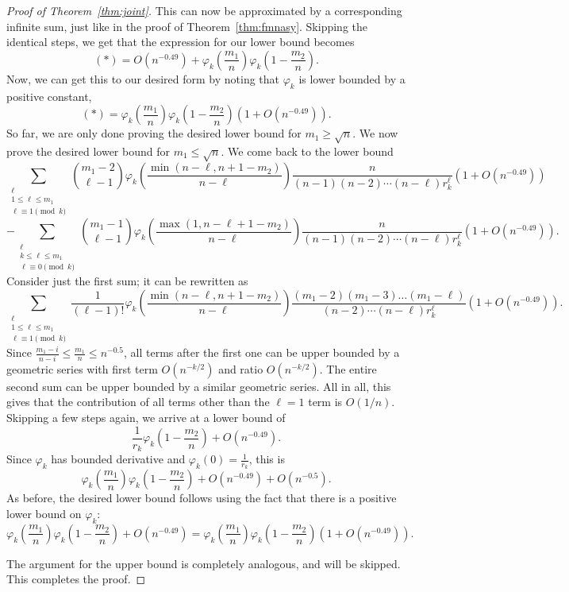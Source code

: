 \documentclass{amsart}
\theoremstyle{definition}
\begin{document}
\begin{proof}[Proof of Theorem~\ref{thm:joint}]
This can now be approximated by a corresponding infinite sum, just like in the proof of Theorem~\ref{thm:fmnasy}. Skipping the identical steps, we get that the expression for our lower bound becomes
\[(*)=O\left(n^{-0.49}\right)+\varphi_k\left(\frac{m_1}{n}\right)\varphi_k\left(1-\frac{m_2}{n}\right).\]
Now, we can get this to our desired form by noting that $\varphi_k$ is lower bounded by a positive constant,
\[(*)=\varphi_k\left(\frac{m_1}{n}\right)\varphi_k\left(1-\frac{m_2}{n}\right)\left(1+O\left(n^{-0.49}\right)\right).\]
So far, we are only done proving the desired lower bound for $m_1\geq \sqrt{n}$. We now prove the desired lower bound for $m_1\leq \sqrt{n}$. We come back to the lower bound
\[\sum_{\substack{\ell\\1\leq \ell \leq m_1\\ \ell\equiv 1 \pmod{k}}}\binom{m_1-2}{\ell-1}\varphi_k\left(\frac{\min(n-\ell,n+1-m_2)}{n-\ell}\right)\frac{n}{(n-1)(n-2)\cdots (n-\ell)r_k^{\ell}}\left(1+O\left(n^{-0.49}\right)\right)\]\[ - \sum_{\substack{\ell\\k\leq \ell \leq m_1\\ \ell\equiv 0 \pmod{k}}}   \binom{m_1-1}{\ell-1}\varphi_k\left(\frac{\max(1,n-\ell+1-m_2)}{n-\ell}\right)\frac{n}{(n-1)(n-2)\cdots (n-\ell)r_k^{\ell}}\left(1+O\left(n^{-0.49}\right)\right).\]
Consider just the first sum; it can be rewritten as
\[\sum_{\substack{\ell\\1\leq \ell \leq m_1\\ \ell\equiv 1 \pmod{k}}}\frac{1}{(\ell-1)!}\varphi_k\left(\frac{\min(n-\ell,n+1-m_2)}{n-\ell}\right)\frac{(m_1-2)(m_1-3)\ldots(m_1-\ell)}{(n-2)\cdots (n-\ell)r_k^{\ell}}\left(1+O\left(n^{-0.49}\right)\right).\]
Since $\frac{m_1-i}{n-i}\leq \frac{m_1}{n}\leq n^{-0.5}$, all terms after the first one can be upper bounded by a geometric series with first term $O(n^{-k/2})$ and ratio $O(n^{-k/2})$. The entire second sum can be upper bounded by a similar geometric series. All in all, this gives that the contribution of all terms other than the $\ell=1$ term is $O(1/n)$. Skipping a few steps again, we arrive at a lower bound of
\[\frac{1}{r_k}\varphi_k\left(1-\frac{m_2}{n}\right)+O\left(n^{-0.49}\right).\]
Since $\varphi_k$ has bounded derivative and $\varphi_k(0)=\frac{1}{r_k}$, this is
\[\varphi_k\left(\frac{m_1}{n}\right)\varphi_k\left(1-\frac{m_2}{n}\right)+O\left(n^{-0.49}\right)+O\left(n^{-0.5}\right).\]
As before, the desired lower bound follows using the fact that there is a positive lower bound on $\varphi_k$:
\[\varphi_k\left(\frac{m_1}{n}\right)\varphi_k\left(1-\frac{m_2}{n}\right)+O\left(n^{-0.49}\right)=\varphi_k\left(\frac{m_1}{n}\right)\varphi_k\left(1-\frac{m_2}{n}\right)\left(1+O\left(n^{-0.49}\right)\right).\]

The argument for the upper bound is completely analogous, and will be skipped. This completes the proof.
\end{proof}
\end{document}
